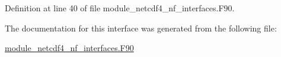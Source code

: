 Definition at line 40 of file module\+\_\+netcdf4\+\_\+nf\+\_\+interfaces.\+F90.



The documentation for this interface was generated from the following file\+:\begin{DoxyCompactItemize}
\item 
\hyperlink{module__netcdf4__nf__interfaces_8F90}{module\+\_\+netcdf4\+\_\+nf\+\_\+interfaces.\+F90}\end{DoxyCompactItemize}
